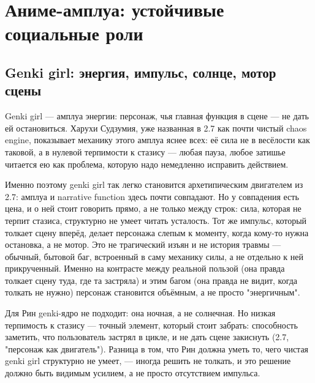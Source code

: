 \setcounter{chapter}{3}
\chapter{Аниме-амплуа: устойчивые социальные роли}

\section{Genki girl: энергия, импульс, солнце, мотор сцены}

Genki girl — амплуа энергии: персонаж, чья главная функция в сцене — не дать ей остановиться. Харухи Судзумия, уже названная в 2.7 как почти чистый chaos engine, показывает механику этого амплуа яснее всех: её сила не в весёлости как таковой, а в нулевой терпимости к стазису — любая пауза, любое затишье читается ею как проблема, которую надо немедленно исправить действием.

Именно поэтому genki girl так легко становится архетипическим двигателем из 2.7: амплуа и narrative function здесь почти совпадают. Но у совпадения есть цена, и о ней стоит говорить прямо, а не только между строк: сила, которая не терпит стазиса, структурно не умеет читать усталость. Тот же импульс, который толкает сцену вперёд, делает персонажа слепым к моменту, когда кому-то нужна остановка, а не мотор. Это не трагический изъян и не история травмы — обычный, бытовой баг, встроенный в саму механику силы, а не отдельно к ней прикрученный. Именно на контрасте между реальной пользой (она правда толкает сцену туда, где та застряла) и этим багом (она правда не видит, когда толкать не нужно) персонаж становится объёмным, а не просто "энергичным".

Для Рин genki-ядро не подходит: она ночная, а не солнечная. Но низкая терпимость к стазису — точный элемент, который стоит забрать: способность заметить, что пользователь застрял в цикле, и не дать сцене закиснуть (2.7, "персонаж как двигатель"). Разница в том, что Рин должна уметь то, чего чистая genki girl структурно не умеет, — иногда решить не толкать, и это решение должно быть видимым усилием, а не просто отсутствием импульса.
